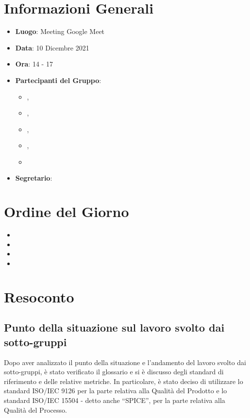 \section{Informazioni Generali}

\begin{itemize}
\item{\textbf{Luogo}}: Meeting Google Meet
\item{\textbf{Data}}: 10 Dicembre 2021
\item{\textbf{Ora}}: 14 - 17
\item{\textbf{Partecipanti del Gruppo}}: 
	\begin{itemize}
	\item{\EP{},} 
	\item{\FP{},}
	\item{\MB{},}
	\item{\MG{},}
	\item{\PV{}}
	\end{itemize} 
\item{\textbf{Segretario}}: \PV{}	
\end{itemize}

\section{Ordine del Giorno}
\begin{itemize}
\item{}
\item{}
\item{}
\item{}
\end{itemize}

\section{Resoconto}

\subsection{Punto della situazione sul lavoro svolto dai sotto-gruppi}

Dopo aver analizzato il punto della situazione e l'andamento del lavoro svolto dai sotto-gruppi, è stato verificato il glossario e si è discusso degli standard di riferimento e delle relative metriche. In particolare, è stato deciso di utilizzare lo standard ISO/IEC 9126 per la parte relativa alla Qualità del Prodotto e lo standard ISO/IEC 15504 - detto anche “SPICE”, per la parte relativa alla Qualità del Processo.

